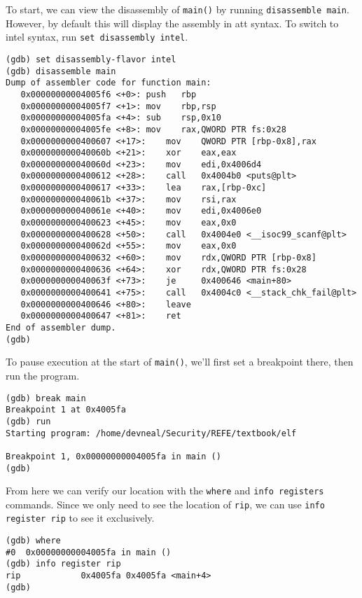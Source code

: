 To start, we can view the disassembly of \texttt{main()} by running
\texttt{disassemble main}. However, by default this will display the assembly in
att syntax. To switch to intel syntax, run \texttt{set disassembly intel}.

\begin{lstlisting}
(gdb) set disassembly-flavor intel
(gdb) disassemble main
Dump of assembler code for function main:
   0x00000000004005f6 <+0>:	push   rbp
   0x00000000004005f7 <+1>:	mov    rbp,rsp
   0x00000000004005fa <+4>:	sub    rsp,0x10
   0x00000000004005fe <+8>:	mov    rax,QWORD PTR fs:0x28
   0x0000000000400607 <+17>:	mov    QWORD PTR [rbp-0x8],rax
   0x000000000040060b <+21>:	xor    eax,eax
   0x000000000040060d <+23>:	mov    edi,0x4006d4
   0x0000000000400612 <+28>:	call   0x4004b0 <puts@plt>
   0x0000000000400617 <+33>:	lea    rax,[rbp-0xc]
   0x000000000040061b <+37>:	mov    rsi,rax
   0x000000000040061e <+40>:	mov    edi,0x4006e0
   0x0000000000400623 <+45>:	mov    eax,0x0
   0x0000000000400628 <+50>:	call   0x4004e0 <__isoc99_scanf@plt>
   0x000000000040062d <+55>:	mov    eax,0x0
   0x0000000000400632 <+60>:	mov    rdx,QWORD PTR [rbp-0x8]
   0x0000000000400636 <+64>:	xor    rdx,QWORD PTR fs:0x28
   0x000000000040063f <+73>:	je     0x400646 <main+80>
   0x0000000000400641 <+75>:	call   0x4004c0 <__stack_chk_fail@plt>
   0x0000000000400646 <+80>:	leave  
   0x0000000000400647 <+81>:	ret    
End of assembler dump.
(gdb) 
\end{lstlisting}

To pause execution at the start of \texttt{main()}, we'll first set a breakpoint
there, then run the program.

\begin{lstlisting}
(gdb) break main
Breakpoint 1 at 0x4005fa
(gdb) run
Starting program: /home/devneal/Security/REFE/textbook/elf 

Breakpoint 1, 0x00000000004005fa in main ()
(gdb) 
\end{lstlisting}

From here we can verify our location with the \texttt{where} and \texttt{info
registers} commands. Since we only need to see the location of \texttt{rip}, we
can use \texttt{info register rip} to see it exclusively.

\begin{lstlisting}
(gdb) where
#0  0x00000000004005fa in main ()
(gdb) info register rip
rip            0x4005fa	0x4005fa <main+4>
(gdb) 
\end{lstlisting}

